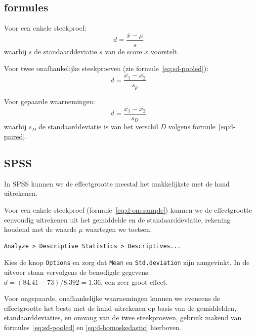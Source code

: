 \documentclass[
]{book}
\begin{document}
\hypertarget{sec:formules13-5}{%
\subsection{formules}\label{sec:formules13-5}}

Voor een enkele steekproef:
\begin{equation}
   \label{eq:d-onesample}
  d = \frac{\overline{x}-\mu}{s}
\end{equation}
waarbij \(s\) de standaarddeviatie \(s\)
van de score \(x\) voorstelt.

Voor twee onafhankelijke steekproeven (zie
formule~\eqref{eq:sd-pooled}):
\begin{equation}
  \label{eq:d-homoskedastic}
  d = \frac{ \overline{x_1}-\overline{x_2} } { s_p }
\end{equation}

Voor gepaarde waarnemingen:
\begin{equation}
  \label{eq:d-paired}
  d = \frac{ \overline{x_1}-\overline{x_2} } { s_D }
\end{equation}
waarbij \(s_D\) de
standaarddeviatie is van het verschil \(D\) volgens
formule~\eqref{eq:d-paired}.

\hypertarget{spss-13-2}{%
\subsection{SPSS}\label{spss-13-2}}

In SPSS kunnen we de effectgrootte meestal het makkelijkste met de hand
uitrekenen.

Voor een enkele steekproef
(formule~\eqref{eq:d-onesample}) kunnen we de effectgrootte eenvoudig
uitrekenen uit het gemiddelde en de standaarddeviatie, rekening houdend
met de waarde \(\mu\) waartegen we toetsen.

\begin{verbatim}
Analyze > Descriptive Statistics > Descriptives...
\end{verbatim}

Kies de knop \texttt{Options} en zorg dat \texttt{Mean} en \texttt{Std.deviation} zijn
aangevinkt. In de uitvoer staan vervolgens de benodigde gegevens:\\
\(d = (84.41 - 73) / 8.392 = 1.36\), een zeer groot effect.

Voor ongepaarde, onafhankelijke waarnemingen kunnen we eveneens de
effectgrootte het beste met de hand uitrekenen op basis van de
gemiddelden, standaarddeviaties, en omvang van de twee steekproeven,
gebruik makend van
formules~\eqref{eq:sd-pooled} en
\eqref{eq:d-homoskedastic} hierboven.
\end{document}
